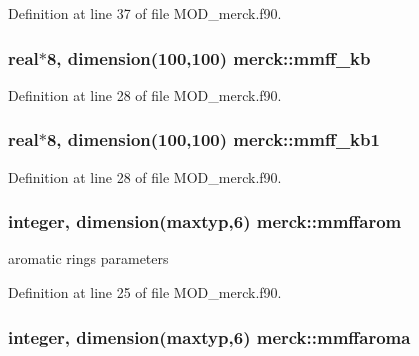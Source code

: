 Definition at line 37 of file M\-O\-D\-\_\-merck.\-f90.

\hypertarget{classmerck_ade44b2ba3b64e8afbedcc8872060e9b1}{
\subsubsection[{mmff\-\_\-kb}]{\setlength{\rightskip}{0pt plus 5cm}real$\ast$8, dimension(100,100) merck\-::mmff\-\_\-kb}}\label{classmerck_ade44b2ba3b64e8afbedcc8872060e9b1}


Definition at line 28 of file M\-O\-D\-\_\-merck.\-f90.

\hypertarget{classmerck_a98eafd9057663a6cdfd35d4342e18601}{
\subsubsection[{mmff\-\_\-kb1}]{\setlength{\rightskip}{0pt plus 5cm}real$\ast$8, dimension(100,100) merck\-::mmff\-\_\-kb1}}\label{classmerck_a98eafd9057663a6cdfd35d4342e18601}


Definition at line 28 of file M\-O\-D\-\_\-merck.\-f90.

\hypertarget{classmerck_a8368ed01140ca93e9b201ebe3019ff45}{
\subsubsection[{mmffarom}]{\setlength{\rightskip}{0pt plus 5cm}integer, dimension(maxtyp,6) merck\-::mmffarom}}\label{classmerck_a8368ed01140ca93e9b201ebe3019ff45}


aromatic rings parameters 



Definition at line 25 of file M\-O\-D\-\_\-merck.\-f90.

\hypertarget{classmerck_a9f269cbd52aea1f1401f71c1ec9b3f3f}{
\subsubsection[{mmffaroma}]{\setlength{\rightskip}{0pt plus 5cm}integer, dimension(maxtyp,6) merck\-::mmffaroma}}\label{classmerck_a9f269cbd52aea1f1401f71c1ec9b3f3f}


